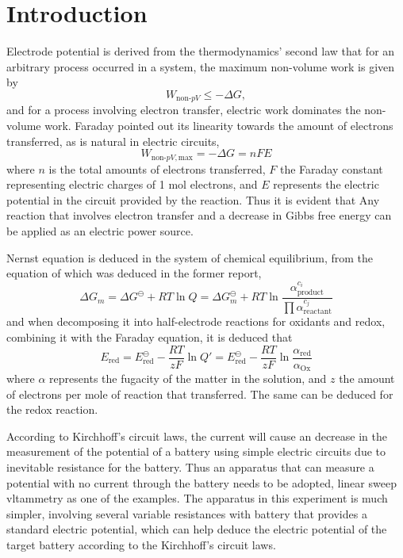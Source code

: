 \documentclass[%
 reprint,
 amsmath,amssymb,
 aps,
10.5pt,
]{revtex4-1}
\begin{document}
\section{Introduction}
Electrode potential is derived from the thermodynamics' second law that for an arbitrary process occurred in a system, the maximum non-volume work is given by
\begin{equation}
W_{\text{non-}pV} \leq  - \Delta G,
\end{equation}
and for a process involving electron transfer, electric work dominates the non-volume work. Faraday pointed out its linearity towards the amount of electrons transferred, as is natural in electric circuits,
\begin{equation}
W_{\text{non-}pV,\text{max}} = - \Delta G　= nFE
\end{equation}
where $n$ is the total amounts of electrons transferred, $F$ the Faraday constant representing electric charges of 1 mol electrons, and $E$ represents the electric potential in the circuit provided by the reaction. Thus it is evident that Any reaction that involves electron transfer and a decrease in Gibbs free energy can be applied as an electric power source.

Nernst equation is deduced in the system of chemical equilibrium, from the equation of which was deduced in the former report,
\begin{equation}
 \Delta G_m = \Delta G^\ominus +  RT \ln Q = \Delta G_m^\ominus + RT \ln{\frac{\alpha_\text{product}^{c_i}}{\prod\alpha_\text{reactant}^{c_j}}}
 \end{equation}
 and when decomposing it into half-electrode reactions for oxidants and redox, combining it with the Faraday equation, it is deduced that
 \begin{equation}
 E_\text{red} = E^\ominus_\text{red} -\frac{RT}{zF} \ln{Q'} = E^\ominus_\text{red} - \frac{RT}{zF} \ln{\frac{\alpha_\text{red}}{\alpha_\text{Ox}}}
\end{equation}
where $\alpha$ represents the fugacity of the matter in the solution, and $z$ the amount of electrons per mole of reaction that transferred. The same can be deduced for the redox reaction.

According to Kirchhoff's circuit laws, the current will cause an decrease in the measurement of the potential of a battery using simple electric circuits due to inevitable resistance for the battery. Thus an apparatus that can measure a potential with no current through the battery needs to be adopted, linear sweep vltammetry as one of the examples. The apparatus in this experiment is much simpler, involving several variable resistances with battery that provides a standard electric potential, which can help deduce the electric potential of the target battery according to the Kirchhoff's circuit laws.
\end{document}
